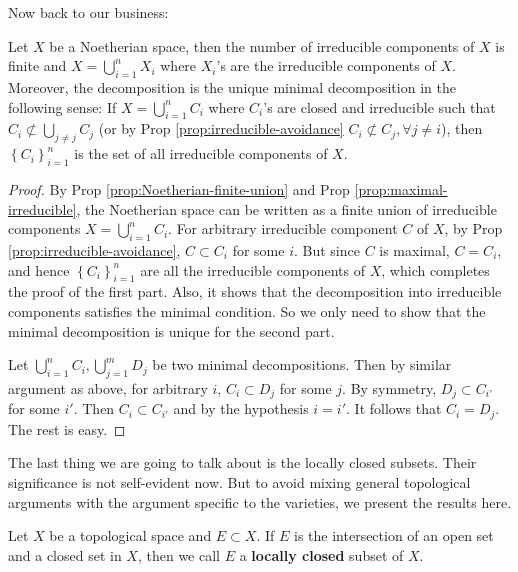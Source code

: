 \documentclass{note-eng}
\begin{document}
Now back to our business:

\begin{proposition} \label{prop:Noetherian-space-minimal}
    Let $X$ be a Noetherian space, then the number of irreducible components of $X$ is finite and $X = \bigcup\limits_{i = 1}^{n} X_i$ where $X_i$'s are the irreducible components of $X$. Moreover, the decomposition is the unique minimal decomposition in the following sense: If $X = \bigcup\limits_{i = 1}^{n} C_i$ where $C_i$'s are closed and irreducible such that $C_i \not \subset \bigcup\limits_{j \ne j} C_j$ (or by Prop \ref{prop:irreducible-avoidance} $C_i \not \subset C_j, \forall j \ne i$), then $\left\lbrace C_i \right\rbrace_{i = 1}^n$ is the set of all irreducible components of $X$.
\end{proposition}

\begin{proof}
    By Prop \ref{prop:Noetherian-finite-union} and Prop \ref{prop:maximal-irreducible}, the Noetherian space can be written as a finite union of irreducible components $X = \bigcup\limits_{i = 1}^{n} C_i$. For arbitrary irreducible component $C$ of $X$, by Prop \ref{prop:irreducible-avoidance}, $C \subset C_i$ for some $i$. But since $C$ is maximal, $C = C_i$, and hence $\left\lbrace C_i \right\rbrace_{i = 1}^n$ are all the irreducible components of $X$, which completes the proof of the first part. Also, it shows that the decomposition into irreducible components satisfies the minimal condition. So we only need to show that the minimal decomposition is unique for the second part.

    Let $\bigcup\limits_{i = 1}^{n} C_i, \bigcup\limits_{j = 1}^{m} D_j$ be two minimal decompositions. Then by similar argument as above, for arbitrary $i$, $C_i \subset D_j$ for some $j$. By symmetry, $D_j \subset C_{i'}$ for some $i'$. Then $C_i \subset C_{i'}$ and by the hypothesis $i = i'$. It follows that $C_i = D_j$. The rest is easy.
\end{proof}

The last thing we are going to talk about is the locally closed subsets. Their significance is not self-evident now. But to avoid mixing general topological arguments with the argument specific to the varieties, we present the results here.

\begin{definition}
    Let $X$ be a topological space and $E \subset X$. If $E$ is the intersection of an open set and a closed set in $X$, then we call $E$ a \textbf{locally closed} subset of $X$.
\end{definition}
\end{document}
